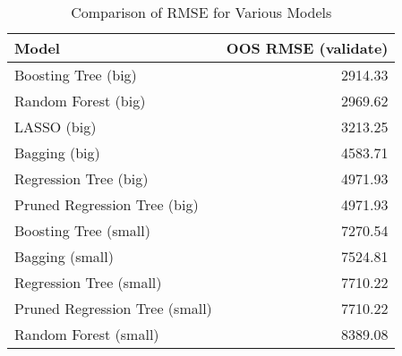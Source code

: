 \begin{table}[ht]
\centering
\caption{Comparison of RMSE for Various Models} 
\label{tab:rmse_comp}
\begin{tabular}{lr}
  \hline
Model & OOS RMSE (validate) \\ 
  \hline
Boosting Tree (big) & 2914.33 \\ 
  Random Forest (big) & 2969.62 \\ 
  LASSO (big) & 3213.25 \\ 
  Bagging (big) & 4583.71 \\ 
  Regression Tree (big) & 4971.93 \\ 
  Pruned Regression Tree (big) & 4971.93 \\ 
  Boosting Tree (small) & 7270.54 \\ 
  Bagging (small) & 7524.81 \\ 
  Regression Tree (small) & 7710.22 \\ 
  Pruned Regression Tree (small) & 7710.22 \\ 
  Random Forest (small) & 8389.08 \\ 
   \hline
\end{tabular}
\end{table}
